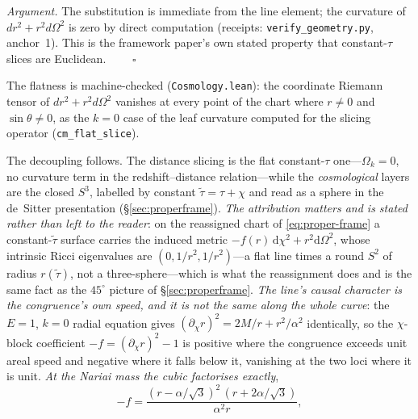 \documentclass[11pt,a4paper]{article}
\theoremstyle{plain}
\theoremstyle{definition}
\theoremstyle{remark}
\newcommand{\dd}{\mathrm{d}}   %
\begin{document}
\noindent\emph{Argument.} The substitution is immediate from the line element; the curvature of $dr^2+r^2d\Omega^2$ is zero by direct computation (receipts: \texttt{verify\_geometry.py}, anchor~1). This is the framework paper's own stated property that constant-$\tau$ slices are Euclidean. $\qquad\square$

The flatness is machine-checked (\texttt{Cosmology.lean}): the coordinate Riemann tensor of $dr^2+r^2d\Omega^2$ vanishes at every point of the chart where $r\ne0$ and $\sin\theta\ne0$, as the $k=0$ case of the leaf curvature computed for the slicing operator (\texttt{cm\_flat\_slice}).

The decoupling follows. The distance slicing is the flat constant-$\tau$ one---$\Omega_k=0$, no curvature term in the redshift--distance relation---while the \emph{cosmological} layers are the closed $S^3$, labelled by constant $\tilde\tau=\tau+\chi$ and read as a sphere in the de~Sitter presentation (\S\ref{sec:properframe}). \emph{The attribution matters and is stated rather than left to the reader}: on the reassigned chart of \eqref{eq:proper-frame} a constant-$\tilde\tau$ surface carries the induced metric $-f(r)\,\dd\chi^2+r^2\dd\Omega^2$, whose intrinsic Ricci eigenvalues are $(0,1/r^2,1/r^2)$---a flat line times a round $S^2$ of radius $r(\tilde\tau)$, not a three-sphere---which is what the reassignment does and is the same fact as the $45^\circ$ picture of \S\ref{sec:properframe}. \emph{The line's causal character is the congruence's own speed, and it is not the same along the whole curve}: the $E=1$, $k=0$ radial equation gives $(\partial_\chi r)^2=2M/r+r^2/\alpha^2$ identically, so the $\chi$-block coefficient $-f=(\partial_\chi r)^2-1$ is positive where the congruence exceeds unit areal speed and negative where it falls below it, vanishing at the two loci where it is unit. \emph{At the Nariai mass the cubic factorises exactly},
\begin{equation}
-f=\frac{(r-\alpha/\sqrt3)^2\,(r+2\alpha/\sqrt3)}{\alpha^2 r},
\label{eq:chi-block-factored}
\end{equation}
\end{document}
